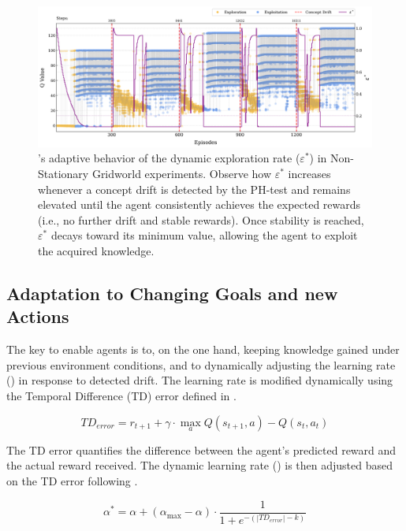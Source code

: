 \begin{figure}
    \centering
    \includegraphics[width=\textwidth]{figures/eps}
    \caption{\adaptiverl's adaptive behavior of the dynamic exploration rate ($\varepsilon^*$) in Non-Stationary Gridworld experiments. Observe how $\varepsilon^*$ increases whenever a concept drift is detected by the PH-test and remains elevated until the agent consistently achieves the expected rewards (i.e., no further drift and stable rewards). Once stability is reached, $\varepsilon^*$ decays toward its minimum value, allowing the agent to exploit the acquired knowledge.}
    \label{fig:dynamic-eps}
\end{figure}

\subsection{Adaptation to Changing Goals and new Actions}
\label{sec:morphin-adaptation}

The key to enable agents is to, on the one hand, keeping knowledge gained under previous 
environment conditions, and to dynamically adjusting the learning rate (\lrate{\alpha}) in response 
to detected drift. The learning rate is modified dynamically using the Temporal Difference (TD) error 
defined in .

\begin{equation} \label{eq:td_error}
    TD_{error} = r_{t+1} + \gamma \cdot \underset{a}{\max} Q(s_{t+1}, a) - Q(s_t, a_t)
\end{equation}

The TD error quantifies the difference between the agent's predicted reward and the actual reward 
received. The dynamic learning rate (\lrate{\alpha^*}) is then adjusted based on the TD error 
following .

\begin{equation}
    \label{eq:dynamic_learning_rate}
    \alpha^* = \alpha + (\alpha_{\max}-\alpha) \cdot \frac{1}{1 + e^{-(|TD_{error}|-k)}}
\end{equation}

